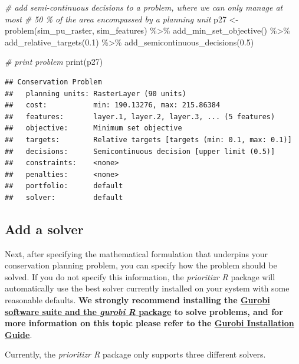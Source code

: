 \documentclass[
  12pt,
]{book}
\newenvironment{Shaded}{\begin{snugshade}}{\end{snugshade}}
\newcommand{\CommentTok}[1]{\textcolor[rgb]{0.56,0.35,0.01}{\textit{#1}}}
\newcommand{\FloatTok}[1]{\textcolor[rgb]{0.00,0.00,0.81}{#1}}
\newcommand{\FunctionTok}[1]{\textcolor[rgb]{0.00,0.00,0.00}{#1}}
\newcommand{\NormalTok}[1]{#1}
\newcommand{\OtherTok}[1]{\textcolor[rgb]{0.56,0.35,0.01}{#1}}
\newcommand{\SpecialCharTok}[1]{\textcolor[rgb]{0.00,0.00,0.00}{#1}}
\begin{document}
\begin{Shaded}
\begin{Highlighting}[]
\CommentTok{\# add semi{-}continuous decisions to a problem, where we can only manage at most}
\CommentTok{\# 50 \% of the area encompassed by a planning unit}
\NormalTok{p27 }\OtherTok{\textless{}{-}} \FunctionTok{problem}\NormalTok{(sim\_pu\_raster, sim\_features) }\SpecialCharTok{\%\textgreater{}\%}
       \FunctionTok{add\_min\_set\_objective}\NormalTok{() }\SpecialCharTok{\%\textgreater{}\%}
       \FunctionTok{add\_relative\_targets}\NormalTok{(}\FloatTok{0.1}\NormalTok{) }\SpecialCharTok{\%\textgreater{}\%}
       \FunctionTok{add\_semicontinuous\_decisions}\NormalTok{(}\FloatTok{0.5}\NormalTok{)}

\CommentTok{\# print problem}
\FunctionTok{print}\NormalTok{(p27)}
\end{Highlighting}
\end{Shaded}

\begin{verbatim}
## Conservation Problem
##   planning units: RasterLayer (90 units)
##   cost:           min: 190.13276, max: 215.86384
##   features:       layer.1, layer.2, layer.3, ... (5 features)
##   objective:      Minimum set objective 
##   targets:        Relative targets [targets (min: 0.1, max: 0.1)]
##   decisions:      Semicontinuous decision [upper limit (0.5)]
##   constraints:    <none>
##   penalties:      <none>
##   portfolio:      default
##   solver:         default
\end{verbatim}

\hypertarget{add-a-solver}{%
\subsection{Add a solver}\label{add-a-solver}}

Next, after specifying the mathematical formulation that underpins your conservation planning problem, you can specify how the problem should be solved. If you do not specify this information, the \emph{prioritizr R} package will automatically use the best solver currently installed on your system with some reasonable defaults. \textbf{We strongly recommend installing the \href{https://www.gurobi.com/}{Gurobi software suite and the \emph{gurobi} \emph{R} package} to solve problems, and for more information on this topic please refer to the \href{gurobi_installation.html}{Gurobi Installation Guide}}.

Currently, the \emph{prioritizr R} package only supports three different solvers.
\end{document}
